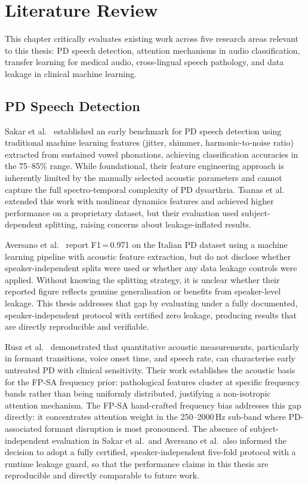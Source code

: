 \documentclass[oneside,openany]{final_report}
\begin{document}
\chapter{Literature Review}

This chapter critically evaluates existing work across five research areas relevant to this thesis: PD speech detection, attention mechanisms in audio classification, transfer learning for medical audio, cross-lingual speech pathology, and data leakage in clinical machine learning.

\section{PD Speech Detection}

Sakar et al.~\cite{sakar2013} established an early benchmark for PD speech detection using traditional machine learning features (jitter, shimmer, harmonic-to-noise ratio) extracted from sustained vowel phonations, achieving classification accuracies in the 75--85\% range. While foundational, their feature engineering approach is inherently limited by the manually selected acoustic parameters and cannot capture the full spectro-temporal complexity of PD dysarthria. Tsanas et al.~\cite{tsanas2012} extended this work with nonlinear dynamics features and achieved higher performance on a proprietary dataset, but their evaluation used subject-dependent splitting, raising concerns about leakage-inflated results.

Aversano et al.~\cite{aversano2022} report F1\,=\,0.971 on the Italian PD dataset using a machine learning pipeline with acoustic feature extraction, but do not disclose whether speaker-independent splits were used or whether any data leakage controls were applied. Without knowing the splitting strategy, it is unclear whether their reported figure reflects genuine generalisation or benefits from speaker-level leakage. This thesis addresses that gap by evaluating under a fully documented, speaker-independent protocol with certified zero leakage, producing results that are directly reproducible and verifiable.

Rusz et al.~\cite{rusz2011} demonstrated that quantitative acoustic measurements, particularly in formant transitions, voice onset time, and speech rate, can characterise early untreated PD with clinical sensitivity. Their work establishes the acoustic basis for the FP-SA frequency prior: pathological features cluster at specific frequency bands rather than being uniformly distributed, justifying a non-isotropic attention mechanism. The FP-SA hand-crafted frequency bias addresses this gap directly: it concentrates attention weight in the 250--2000\,Hz sub-band where PD-associated formant disruption is most pronounced. The absence of subject-independent evaluation in Sakar et al.\ and Aversano et al.\ also informed the decision to adopt a fully certified, speaker-independent five-fold protocol with a runtime leakage guard, so that the performance claims in this thesis are reproducible and directly comparable to future work.
\end{document}
